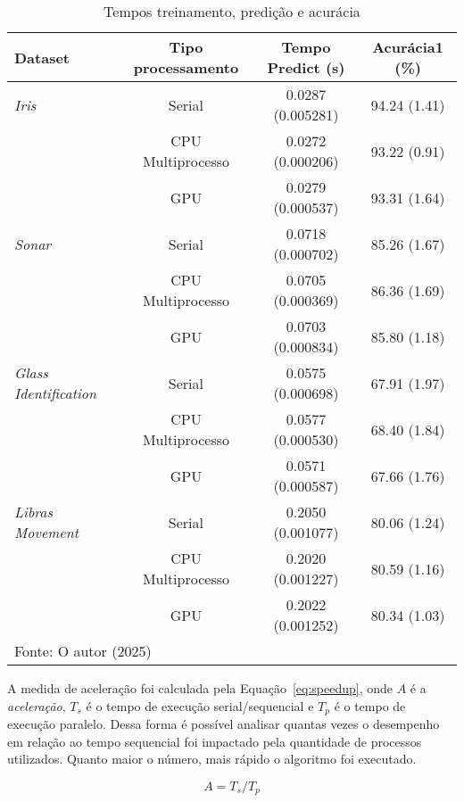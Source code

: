 \begin{table}
\caption{Tempos treinamento, predição e acurácia}
\begin{center}
\fontsize{10pt}{13pt}\selectfont
\begin{tabular}{lccc}
\hline
Dataset                       & Tipo processamento  &   Tempo Predict (s)    &Acurácia1 (\%) \\
\hline
\textit{Iris}                 & Serial              &  0.0287 (0.005281)     & 94.24 (1.41)  \\
                              & CPU Multiprocesso   &  0.0272 (0.000206)     & 93.22 (0.91)  \\
                              & GPU                 &  0.0279 (0.000537)     & 93.31 (1.64)  \\
\hline
\textit{Sonar}                & Serial              &  0.0718 (0.000702)     & 85.26 (1.67)  \\
                              & CPU Multiprocesso   &  0.0705 (0.000369)     & 86.36 (1.69)  \\
                              & GPU                 &  0.0703 (0.000834)     & 85.80 (1.18)  \\
\hline
\textit{Glass Identification} & Serial              &  0.0575 (0.000698)     & 67.91 (1.97)  \\
                              & CPU Multiprocesso   &  0.0577 (0.000530)     & 68.40 (1.84)  \\
                              & GPU                 &  0.0571 (0.000587)     & 67.66 (1.76)  \\
\hline
\textit{Libras Movement}      & Serial              &  0.2050 (0.001077)     & 80.06 (1.24)  \\
                              & CPU Multiprocesso   &  0.2020 (0.001227)     & 80.59 (1.16)  \\
                              & GPU                 &  0.2022 (0.001252)     & 80.34 (1.03)  \\
\hline
\multicolumn{4}{l}{Fonte: O autor (2025)}
\end{tabular}
\label{tab:resultados}
\end{center}
\end{table}


A medida de aceleração %
foi calculada pela Equação~\eqref{eq:speedup}, onde \(A\) é a \textit{aceleração}, \(T_s\) é o tempo de execução serial/sequencial e \(T_p\) é o tempo de execução paralelo. Dessa forma é possível analisar quantas vezes o desempenho em relação ao tempo sequencial foi impactado pela quantidade de processos utilizados. Quanto maior o número, mais rápido o algoritmo foi executado. 

\begin{equation} 
A = T_s / T_p
\label{eq:speedup}
\end{equation}